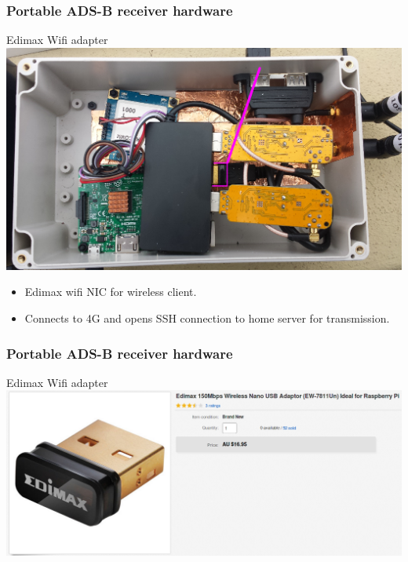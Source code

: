 \begin{frame}
\frametitle{Portable ADS-B receiver hardware}
\begin{block}{Edimax Wifi adapter}
\includegraphics[height=0.5\textheight]{image/adsb-hardware-edimax.png}
\begin{itemize}
\item Edimax wifi NIC for wireless client.
\item Connects to 4G and opens SSH connection to home server for transmission.
\end{itemize}
\end{block}
\end{frame}

\begin{frame}
\frametitle{Portable ADS-B receiver hardware}
\begin{block}{Edimax Wifi adapter}
\includegraphics[height=0.4\textheight]{image/ebay-edimax.png}
\end{block}
\end{frame}


